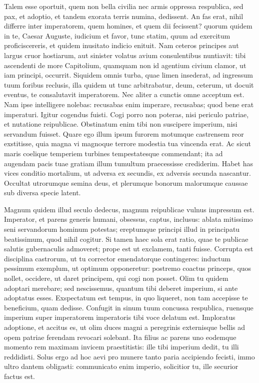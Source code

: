 Talem esse oportuit, quem non bella civilia nec armis oppressa respublica, sed pax, et adoptio, et tandem exorata terris numina, dedissent. An fas erat, nihil differre inter imperatorem, quem homines, et quem dii fecissent? quorum quidem in te, Caesar Auguste, iudicium et favor, tunc statim, quum ad exercitum proficiscereris, et quidem inusitato indicio enituit. Nam ceteros principes aut largus cruor hostiarum, aut sinister volatus avium consulentibus nuntiavit: tibi ascendenti de more Capitolium, quamquam non id agentium civium clamor, ut iam principi, occurrit. Siquidem omnis turba, quae limen insederat, ad ingressum tuum foribus reclusis, illa quidem ut tunc arbitrabatur, deum, ceterum, ut docuit eventus, te consalutavit imperatorem. Nec aliter a cunctis omne acceptum est. Nam ipse intelligere nolebas: recusabas enim imperare, recusabas; quod bene erat imperaturi. Igitur cogendus fuisti. Cogi porro non poteras, nisi periculo patriae, et nutatione reipublicae. Obstinatum enim tibi non suscipere imperium, nisi servandum fuisset. Quare ego illum ipsum furorem motumque castrensem reor exstitisse, quia magna vi magnoque terrore modestia tua vincenda erat. Ac sicut maris coelique temperiem turbines tempestatesque commendant; ita ad augendam pacis tuae gratiam illum tumultum praecessisse crediderim. Habet has vices conditio mortalium, ut adversa ex secundis, ex adversis secunda nascantur. Occultat utrorumque semina deus, et plerumque bonorum malorumque caussae sub diversa specie latent.

Magnum quidem illud seculo dedecus, magnum reipublicae vulnus impressum est. Imperator, et parens generis humani, obsessus, captus, inclusus: ablata mitissimo seni servandorum hominum potestas; ereptumque principi illud in principatu beatissimum, quod nihil cogitur. Si tamen haec sola erat ratio, quae te publicae salutis gubernaculis admoveret; prope est ut exclamem, tanti fuisse. Corrupta est disciplina castrorum, ut tu corrector emendatorque contingeres: inductum pessimum exemplum, ut optimum opponeretur: postremo coactus princeps, quos nollet, occidere, ut daret principem, qui cogi non posset. Olim tu quidem adoptari merebare; sed nescissemus, quantum tibi deberet imperium, si ante adoptatus esses. Exspectatum est tempus, in quo liqueret, non tam accepisse te beneficium, quam dedisse. Confugit in sinum tuum concussa respublica, ruensque imperium super imperatorem imperatoris tibi voce delatum est. Imploratus adoptione, et accitus es, ut olim duces magni a peregrinis externisque bellis ad opem patriae ferendam revocari solebant. Ita filius ac parens uno eodemque momento rem maximam invicem praestitistis: ille tibi imperium dedit, tu illi reddidisti. Solus ergo ad hoc aevi pro munere tanto paria accipiendo fecisti, immo ultro dantem obligasti: communicato enim imperio, solicitior tu, ille securior factus est.

